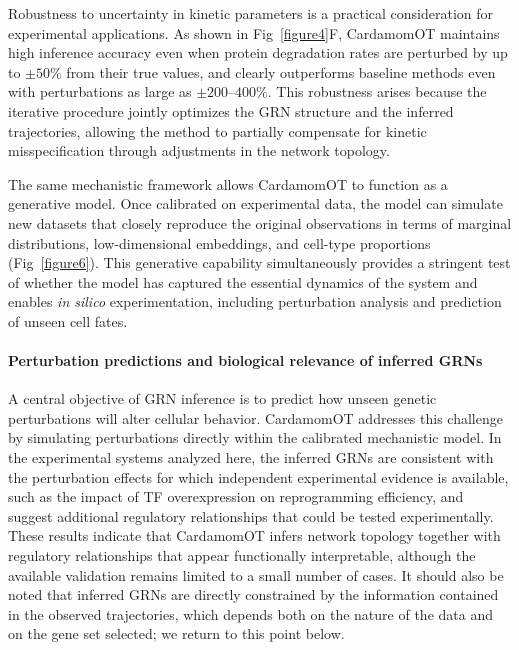 \documentclass[a4paper, 11pt]{article}
\theoremstyle{plain}
\theoremstyle{remark}
\newcommand*{\firstreview}[1]{{\color{black}#1}}
\begin{document}
Robustness to uncertainty in kinetic parameters is a practical consideration for experimental applications. As shown in Fig~\ref{figure4}F, CardamomOT maintains high inference accuracy even when protein degradation rates are perturbed by up to $\pm 50\%$ from their true values, and clearly outperforms baseline methods even with perturbations as large as $\pm 200$--$400\%$. This robustness arises because the iterative procedure jointly optimizes the GRN structure and the inferred trajectories, allowing the method to partially compensate for kinetic misspecification through adjustments in the network topology.

The same mechanistic framework allows CardamomOT to function as a generative model. Once calibrated on experimental data, the model can simulate new datasets that closely reproduce the original observations in terms of marginal distributions, low-dimensional embeddings, and cell-type proportions (Fig~\ref{figure6}). This generative capability simultaneously provides a stringent test of whether the model has captured the essential dynamics of the system and enables \textit{in silico} experimentation, including perturbation analysis and prediction of unseen cell fates.

\paragraph{Perturbation predictions and biological relevance of inferred GRNs}
A central objective of GRN inference is to predict how unseen genetic perturbations
will alter cellular behavior. CardamomOT addresses this challenge by simulating
perturbations directly within the calibrated mechanistic model. In the experimental
systems analyzed here, the inferred GRNs \firstreview{are consistent with the
perturbation effects for which independent experimental evidence is available,} such as
the impact of \firstreview{TF} overexpression on reprogramming efficiency, and suggest
additional regulatory relationships that could be tested experimentally. These results
indicate that CardamomOT infers network topology \firstreview{together with regulatory
relationships that appear functionally interpretable, although the available validation
remains limited to a small number of cases.} \firstreview{It should also be noted that inferred GRNs are directly constrained by the information contained in the observed trajectories, which depends both on the nature of the data and on the gene set selected; we return to this point below.}
\end{document}

